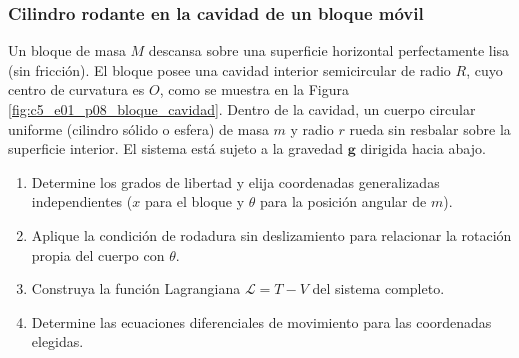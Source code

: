 \subsubsection{Cilindro rodante en la cavidad de un bloque móvil}

Un bloque de masa $M$ descansa sobre una superficie horizontal perfectamente lisa (sin
fricción). El bloque posee una cavidad interior semicircular de radio $R$, cuyo centro de
curvatura es $O$, como se muestra en la Figura \ref{fig:c5_e01_p08_bloque_cavidad}. Dentro
de la cavidad, un cuerpo circular uniforme (cilindro sólido o esfera) de masa $m$ y radio
$r$ rueda sin resbalar sobre la superficie interior. El sistema está sujeto a la gravedad
$\mathbf{g}$ dirigida hacia abajo.

\begin{enumerate}
    \item Determine los grados de libertad y elija coordenadas generalizadas
          independientes ($x$ para el bloque y $\theta$ para la posición angular de $m$).
    \item Aplique la condición de rodadura sin deslizamiento para relacionar la rotación
          propia del cuerpo con $\theta$.
    \item Construya la función Lagrangiana $\mathcal{L}=T-V$ del sistema completo.
    \item Determine las ecuaciones diferenciales de movimiento para las coordenadas
          elegidas.
\end{enumerate}

